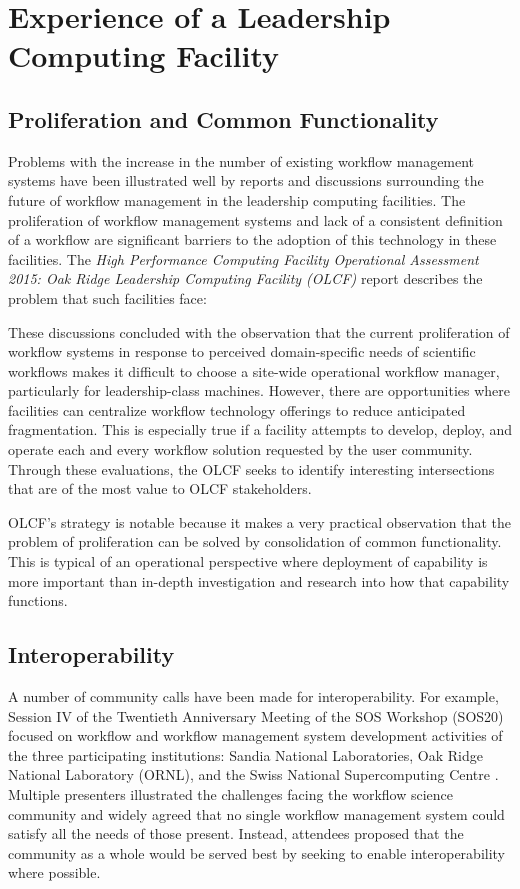 \section{Experience of a Leadership Computing Facility}\label{olcf}

\subsection{Proliferation and Common Functionality} \label{commonFunc}

Problems with the increase in the number of existing workflow management
systems have been illustrated well by reports and discussions surrounding the
future of workflow management in the leadership computing facilities. The
proliferation of workflow management systems and lack of a consistent
definition of a workflow are significant barriers to the adoption of this
technology in these facilities. The \textit{High Performance Computing Facility
Operational Assessment 2015: Oak Ridge Leadership Computing Facility (OLCF)}
report \cite{barker_scientific_2007} describes the problem that such
facilities face:  \begin{displayquote} These discussions concluded with the
observation that the current proliferation of workflow systems in response to
perceived domain-specific needs of scientific workflows makes it difficult to
choose a site-wide operational workflow manager, particularly for
leadership-class machines. However, there are opportunities where facilities
can centralize workflow technology offerings to reduce anticipated
fragmentation. This is especially true if a facility attempts to develop,
deploy, and operate each and every workflow solution requested by the user
community. Through these evaluations, the OLCF seeks to identify interesting
intersections that are of the most value to OLCF stakeholders.
\end{displayquote}  OLCF's strategy is notable because it makes a
very practical observation that the problem of proliferation can be solved by
consolidation of common functionality. This is typical of an operational
perspective where deployment of capability is more important than in-depth
investigation and research into how that capability functions.

\subsection{Interoperability}\label{interop}

A number of community calls have been made for interoperability. For example,
Session IV of the Twentieth Anniversary Meeting of the SOS Workshop (SOS20)
focused on workflow and workflow management system development activities of
the three participating institutions: Sandia National Laboratories, Oak Ridge
National Laboratory (ORNL), and the Swiss National Supercomputing Centre
\cite{pack_sos20_2016}. Multiple presenters illustrated the challenges facing
the workflow science community and widely agreed that no single workflow
management system could satisfy all the needs of those present. Instead,
attendees proposed that the community as a whole would be served best by
seeking to enable interoperability where possible.

